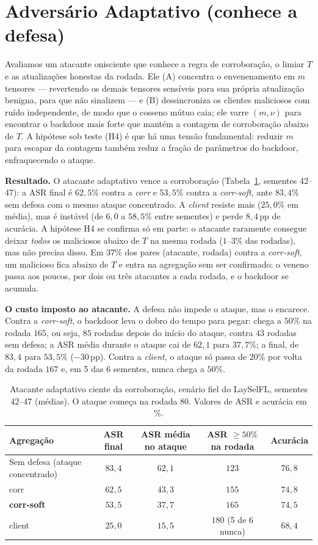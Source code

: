 \section{Adversário Adaptativo (conhece a defesa)}\label{sec:adaptive}
Avaliamos um atacante onisciente que conhece a regra de corroboração, o limiar $T$ e as
atualizações honestas da rodada. Ele (A) concentra o envenenamento em $m$ tensores --- revertendo
os demais tensores sensíveis para sua própria atualização benigna, para que não sinalizem --- e (B)
dessincroniza os clientes maliciosos com ruído independente, de modo que o cosseno mútuo caia; ele
varre $(m,\nu)$ para encontrar o backdoor mais forte que mantém a contagem de corroboração abaixo de
$T$. A hipótese sob teste (H4) é que há uma tensão fundamental: reduzir $m$ para escapar da contagem
também reduz a fração de parâmetros do backdoor, enfraquecendo o ataque.

\textbf{Resultado.} O atacante adaptativo vence a corroboração (Tabela~\ref{tab:adapt}, sementes 42--47):
a ASR final é $62{,}5\%$ contra a \emph{corr} e $53{,}5\%$ contra a \emph{corr-soft}, ante $83{,}4\%$ sem
defesa com o mesmo ataque concentrado. A \emph{client} resiste mais ($25{,}0\%$ em média), mas é instável
(de $6{,}0$ a $58{,}5\%$ entre sementes) e perde $8{,}4$\,pp de acurácia. A hipótese H4 se confirma só em
parte: o atacante raramente consegue deixar \emph{todos} os maliciosos abaixo de $T$ na mesma rodada
($1$--$3\%$ das rodadas), mas não precisa disso. Em $37\%$ dos pares (atacante, rodada) contra a
\emph{corr-soft}, um malicioso fica abaixo de $T$ e entra na agregação sem ser confirmado; o veneno passa
aos poucos, por dois ou três atacantes a cada rodada, e o backdoor se acumula.

\textbf{O custo imposto ao atacante.} A defesa não impede o ataque, mas o encarece. Contra a
\emph{corr-soft}, o backdoor leva o dobro do tempo para pegar: chega a $50\%$ na rodada $165$, ou seja,
$85$ rodadas depois do início do ataque, contra $43$ rodadas sem defesa; a ASR média durante o ataque
cai de $62{,}1$ para $37{,}7\%$; a final, de $83{,}4$ para $53{,}5\%$ ($-30$\,pp). Contra a \emph{client},
o ataque só passa de $20\%$ por volta da rodada $167$ e, em 5 das 6 sementes, nunca chega a $50\%$.

\begin{table}[t]\centering\small
\caption{Atacante adaptativo ciente da corroboração, cenário fiel do LaySelFL, sementes 42--47 (médias).
O ataque começa na rodada 80. Valores de ASR e acurácia em \%.}
\label{tab:adapt}
\begin{tabular}{lcccc}
\toprule
Agregação & ASR final & ASR média no ataque & ASR $\geq 50\%$ na rodada & Acurácia \\
\midrule
Sem defesa (ataque concentrado) & $83{,}4$ & $62{,}1$ & $123$ & $76{,}8$ \\
corr & $62{,}5$ & $43{,}3$ & $155$ & $74{,}8$ \\
\textbf{corr-soft} & $53{,}5$ & $37{,}7$ & $165$ & $74{,}5$ \\
client & $25{,}0$ & $15{,}5$ & $180$ (5 de 6 nunca) & $68{,}4$ \\
\bottomrule
\end{tabular}
\end{table}

